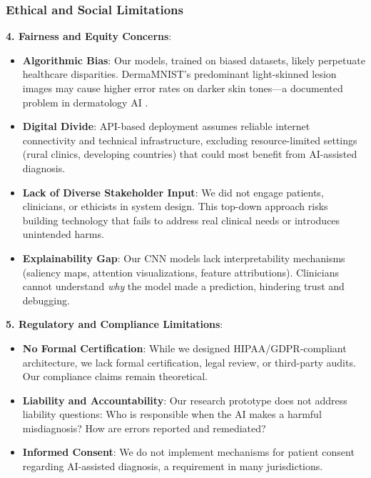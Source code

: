 \documentclass[12pt,a4paper]{article}
\begin{document}
\subsubsection{Ethical and Social Limitations}

\textbf{4. Fairness and Equity Concerns}:

\begin{itemize}
    \item \textbf{Algorithmic Bias}: Our models, trained on biased datasets, likely perpetuate healthcare disparities. DermaMNIST's predominant light-skinned lesion images may cause higher error rates on darker skin tones—a documented problem in dermatology AI \cite{esteva2017dermatologist}.
    
    \item \textbf{Digital Divide}: API-based deployment assumes reliable internet connectivity and technical infrastructure, excluding resource-limited settings (rural clinics, developing countries) that could most benefit from AI-assisted diagnosis.
    
    \item \textbf{Lack of Diverse Stakeholder Input}: We did not engage patients, clinicians, or ethicists in system design. This top-down approach risks building technology that fails to address real clinical needs or introduces unintended harms.
    
    \item \textbf{Explainability Gap}: Our CNN models lack interpretability mechanisms (saliency maps, attention visualizations, feature attributions). Clinicians cannot understand \textit{why} the model made a prediction, hindering trust and debugging.
\end{itemize}

\textbf{5. Regulatory and Compliance Limitations}:

\begin{itemize}
    \item \textbf{No Formal Certification}: While we designed HIPAA/GDPR-compliant architecture, we lack formal certification, legal review, or third-party audits. Our compliance claims remain theoretical.
    
    \item \textbf{Liability and Accountability}: Our research prototype does not address liability questions: Who is responsible when the AI makes a harmful misdiagnosis? How are errors reported and remediated?
    
    \item \textbf{Informed Consent}: We do not implement mechanisms for patient consent regarding AI-assisted diagnosis, a requirement in many jurisdictions.
\end{itemize}
\end{document}
